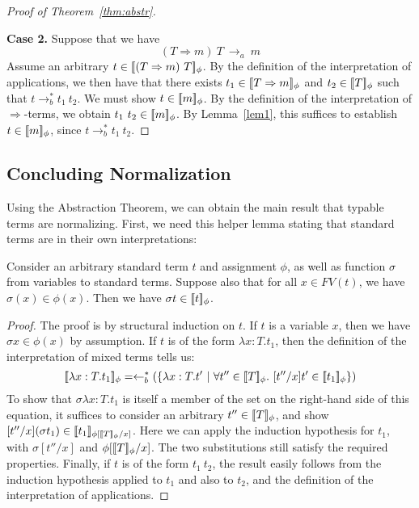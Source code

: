 \documentclass{LMCS}
\newcommand{\To}[0]{\Rightarrow}
\newcommand{\interp}[1]{[\negthinspace[#1]\negthinspace]}
\newcommand{\ot}[0]{\leftarrow}
\begin{document}
\begin{proof}[Proof of Theorem~\ref{thm:abstr}]
\

\noindent \textbf{Case 2.} Suppose that we have
\[
(T\To m)\ T\ \to_a\ m
\]
\noindent Assume an arbitrary $t\in\interp{(T\To m)\ T}_\phi$.  By the
definition of the interpretation of applications, we then have that
there exists $t_1\in\interp{T\To m}_\phi$ and $t_2\in\interp{T}_\phi$
such that $t\to_b^* t_1\ t_2$.  We must show $t\in\interp{m}_\phi$.
By the definition of the interpretation of $\To$-terms, we obtain
$t_1\ t_2\in\interp{m}_\phi$.  By Lemma~\ref{lem1}, this suffices
to  establish $t\in\interp{m}_\phi$, since $t\to_b^* t_1\ t_2$.
\end{proof}

\subsection{Concluding Normalization}

Using the Abstraction Theorem, we can obtain the main result that
typable terms are normalizing.  First, we need this helper lemma
stating that standard terms are in their own interpretations:

\begin{lem}
\label{lem:inown}
Consider an arbitrary standard term $t$ and assignment $\phi$, as well
as function $\sigma$ from variables to standard terms.  Suppose also
that for all $x\in\textit{FV}(t)$, we have $\sigma(x)\in\phi(x)$.  Then
we have $\sigma t\in\interp{t}_\phi$.
\end{lem}
\begin{proof}
The proof is by structural induction on $t$.  If $t$ is a
variable $x$, then we have $\sigma x\in\phi(x)$ by assumption.  If $t$
is of the form $\lambda x:T.t_1$, then the definition of the
interpretation of mixed terms tells us:
\[
\interp{\lambda x:T.t_1}_\phi = \ot_b^*(\{ \lambda x:T.t'\ |\ \forall t''\in\interp{T}_\phi.\ [t''/x]t'\in\interp{t_1}_\phi \})
\]
\noindent To show that $\sigma\lambda x:T.t_1$ is itself a member of the set
on the right-hand side of this equation, it suffices to consider an
arbitrary $t''\in\interp{T}_\phi$, and show $[t''/x](\sigma
t_1)\in\interp{t_1}_{\phi[\interp{T}_\phi/x]}$.  Here we can apply the
induction hypothesis for $t_1$, with $\sigma[t''/x]$ and
$\phi[\interp{T}_\phi/x]$.  The two substitutions still satisfy the
required properties.  Finally, if $t$ is of the form $t_1\ t_2$, the
result easily follows from the induction hypothesis applied to $t_1$
and also to $t_2$, and the definition of the interpretation of
applications.
\end{proof}
\end{document}
